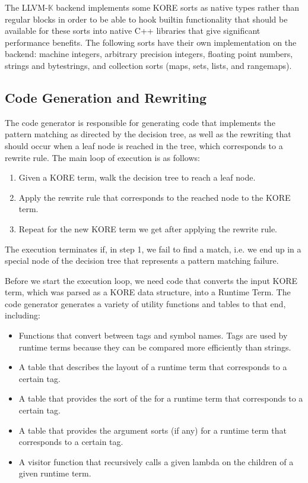 \documentclass{article}
\theoremstyle{definition}
\newcommand{\K}{$\mathbb{K}$\xspace}
\newcommand{\KL}{LLVM-\K}
\begin{document}
The \KL backend implements some KORE sorts as native types rather than regular blocks in order to be able to hook builtin functionality that should be available for these sorts into native C++ libraries that give significant performance benefits. The following sorts have their own implementation on the backend: machine integers, arbitrary precision integers, floating point numbers, strings and bytestrings, and collection sorts (maps, sets, lists, and rangemaps).


\subsection{Code Generation and Rewriting} \label{sec:codegen-overview}
The code generator is responsible for generating code that implements the pattern matching as directed by the decision tree, as well as the rewriting that should occur when a leaf node is reached in the tree, which corresponds to a rewrite rule. The main loop of execution is as follows:
\begin{enumerate}
    \item Given a KORE term, walk the decision tree to reach a leaf node.
    \item Apply the rewrite rule that corresponds to the reached node to the KORE term.
    \item Repeat for the new KORE term we get after applying the rewrite rule.
\end{enumerate}
The execution terminates if, in step 1, we fail to find a match, i.e. we end up in a special node of the decision tree that represents a pattern matching failure.

Before we start the execution loop, we need code that converts the input KORE term, which was parsed as a KORE data structure, into a Runtime Term. The code generator generates a variety of utility functions and tables to that end, including:
\begin{itemize}
    \item Functions that convert between tags and symbol names. Tags are used by runtime terms because they can be compared more efficiently than strings.
    \item A table that describes the layout of a runtime term that corresponds to a certain tag.
    \item A table that provides the sort of the for a runtime term that corresponds to a certain tag.
    \item A table that provides the argument sorts (if any) for a runtime term that corresponds to a certain tag.
    \item A visitor function that recursively calls a given lambda on the children of a given runtime term.
\end{itemize}
\end{document}
